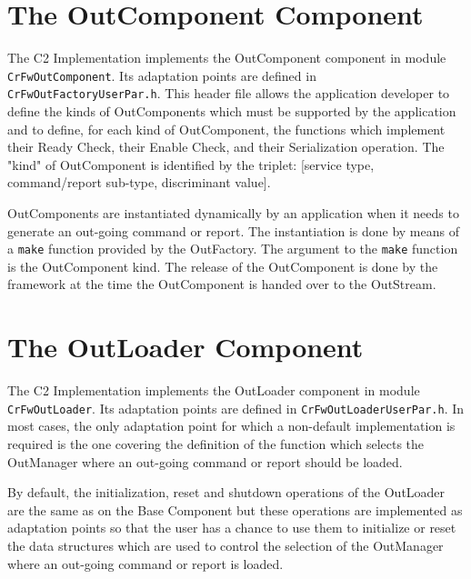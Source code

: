 \documentclass{pnp_article}
\begin{document}
\section{The OutComponent Component}\label{sec:OutComponent}
 

The C2 Implementation implements the OutComponent component in module \texttt{CrFwOutComponent}. Its adaptation points are defined in \texttt{CrFwOutFactoryUserPar.h}. This header file allows the application developer to define the kinds of OutComponents which must be supported by the application and to define, for each kind of OutComponent, the functions which implement their Ready Check, their Enable Check, and their Serialization operation. The "kind" of OutComponent is identified by the triplet: [service type, command/report sub-type, discriminant value]. 

OutComponents are instantiated dynamically by an application when it needs to generate an out-going command or report. The instantiation is done by means of a \texttt{make} function provided by the OutFactory. The argument to the \texttt{make} function is the OutComponent kind. The release of the OutComponent is done by the framework at the time the OutComponent is handed over to the OutStream.

\section{The OutLoader Component}\label{sec:OutLoader}


The C2 Implementation implements the OutLoader component in module \texttt{CrFwOutLoader}. Its adaptation points are defined in \texttt{CrFwOutLoaderUserPar.h}. In most cases, the only adaptation point for which a non-default implementation is required is the one covering the definition of the function which selects the OutManager where an out-going command or report should be loaded. 

By default, the initialization, reset and shutdown operations of the OutLoader are the same as on the Base Component but these operations are implemented as adaptation points so that the user has a chance to use them to initialize or reset the data structures which are used to control the selection of the OutManager where an out-going command or report is loaded.
\end{document}
